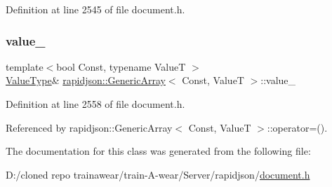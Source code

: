 Definition at line 2545 of file document.\+h.

\mbox{\label{classrapidjson_1_1_generic_array_aa07e77345654d3046ed522d533d23f00}} 
\subsubsection{\texorpdfstring{value\_}{value\_}}
{\footnotesize\ttfamily template$<$bool Const, typename ValueT $>$ \\
\mbox{\hyperlink{classrapidjson_1_1_generic_array_aebd828a2f020262b41af908fbb28a571}{Value\+Type}}\& \mbox{\hyperlink{classrapidjson_1_1_generic_array}{rapidjson\+::\+Generic\+Array}}$<$ Const, ValueT $>$\+::value\+\_\+\hspace{0.3cm}{\ttfamily [private]}}



Definition at line 2558 of file document.\+h.



Referenced by rapidjson\+::\+Generic\+Array$<$ Const, Value\+T $>$\+::operator=().



The documentation for this class was generated from the following file\+:\begin{DoxyCompactItemize}
\item 
D\+:/cloned repo trainawear/train-\/\+A-\/wear/\+Server/rapidjson/\mbox{\hyperlink{document_8h}{document.\+h}}\end{DoxyCompactItemize}
